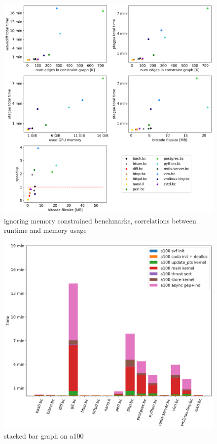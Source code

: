 \begin{figure}
    \centering
    \includegraphics[width=.9\textwidth]{img/correlations.png}
    \caption{ignoring memory constrained benchmarks, correlations between runtime and memory usage}
    \label{fig:correlations}
\end{figure}

\begin{figure}
    \centering
    \includegraphics[width=.9\textwidth]{img/stackedbar-a100.png}
    \caption{stacked bar graph on a100}
    \label{fig:stackedbar-a100}
\end{figure}

